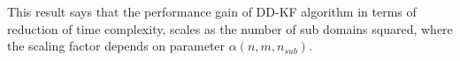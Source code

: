 

\normalsize
This result says that  the performance gain of DD-KF algorithm in terms of  reduction of time complexity, scales as the number of sub domains squared, where the scaling factor depends on parameter $\alpha(n,m,n_{sub})$.


